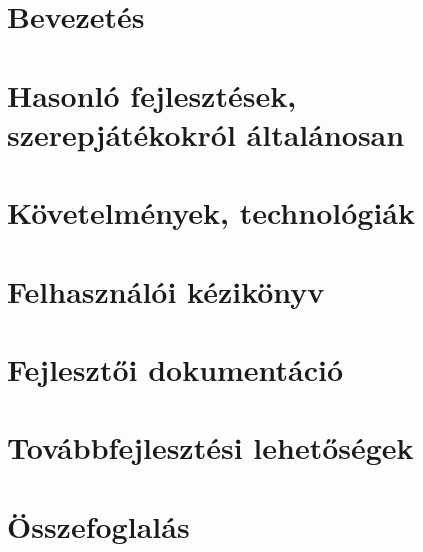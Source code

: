 \documentclass[a4paper,oneside,10pt]{report}
\begin{document}
\chapter{Bevezetés}
\label{bev}


\chapter{Hasonló fejlesztések, szerepjátékokról általánosan}
\label{bem}


\chapter{Követelmények, technológiák}
\label{kovetelmeny}


\chapter{Felhasználói kézikönyv}
\label{usermanual}


\chapter{Fejlesztői dokumentáció}
\label{devmanual}


\chapter{Továbbfejlesztési lehetőségek}
\label{tovabbfejlesztes}


\chapter{Összefoglalás}
\label{osszefoglalas}









\newpage
\end{document}
